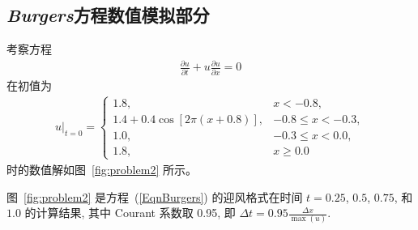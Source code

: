 \documentclass[10.5pt
]{article}
\begin{document}
\subsection{\textit{Burgers}方程数值模拟部分}
考察方程
\begin{align}
\frac{\partial u}{\partial t} + u \frac{\partial u}{\partial x} = 0
\end{align}
在初值为
\begin{align}
u|_{t=0} = \left\{\begin{array}{ll} 1.8, & x < -0.8,
\\
1.4 + 0.4 \cos\left[2 \pi (x + 0.8) \right], & -0.8 \le x < -0.3,
\\
1.0, & -0.3 \le x < 0.0,
\\
1.8, & x \ge 0.0
\end{array} \right.
\end{align}
时的数值解如图~\ref{fig:problem2} 所示。

图~\ref{fig:problem2} 是方程~(\ref{EqnBurgers}) 的迎风格式在时间 $t = 0.25$, $0.5$, $0.75$, 和 $1.0$ 的计算结果, 其中 Courant 系数取 0.95,
即 $\Delta t = 0.95 \frac{\Delta x}{\max(u)}$.
\end{document}
